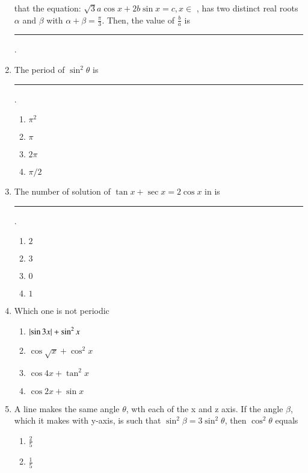 \begin{enumerate}[label=\thesubsection.\arabic*,ref=\thesubsection.\theenumi]
that the equation:
%
$\sqrt{3} a\cos x+2b\sin x = c,x\in$ 
, has two distinct real roots $\alpha$ and $\beta$ with $\alpha+\beta=\frac{\pi}{3}$. Then, the value of $\frac{b}{a}$  is \rule{1cm}{0.1pt}.
\hfill{}
\item The period of $\sin^2 \theta$  is \rule{1cm}{0.1pt}.\hfill{} 
\begin{multicols}{4}
\begin{enumerate}
\item $\pi^2$
\columnbreak
\item $\pi$
\columnbreak
\item $2\pi$
\columnbreak
\item $\pi/2$
\end{enumerate}
\end{multicols}
\item The number of solution of $\tan x + \sec x=2\cos x$ in   is \rule{1cm}{0.1pt}.\hfill{} 
\begin{multicols}{4}
\begin{enumerate}
\item $2$
\columnbreak
\item $3$
\columnbreak
\item $0$
\columnbreak
\item $1$
\end{enumerate}
\end{multicols}
\item Which one is not periodic \hfill{}
\begin{multicols}{2} 
\begin{enumerate}
\item $\left\vert\sin3x\right\vert+\sin^2 x$
\item $\cos\sqrt{x}+\cos^2 x$
\columnbreak
\item $\cos4x+\tan^2 x$
\item $\cos2x+\sin x$
\end{enumerate}
\end{multicols}
\item A line makes the same angle $\theta$, wth each of the x and z axis. 
If the angle $\beta$, which it makes with y-axis, is such that
$\sin^2 \beta=3\sin^2 \theta$, then $\cos^2 \theta$ equals \hfill{}
\begin{multicols}{2} 
\begin{enumerate}
\item $\frac{2}{5}$
\item $\frac{1}{5}$
\columnbreak

\end{enumerate}
\end{multicols}
\end{enumerate}

